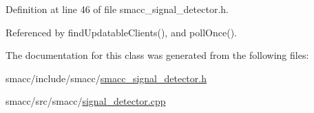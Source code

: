 Definition at line 46 of file smacc\+\_\+signal\+\_\+detector.\+h.



Referenced by find\+Updatable\+Clients(), and poll\+Once().



The documentation for this class was generated from the following files\+:\begin{DoxyCompactItemize}
\item 
smacc/include/smacc/\hyperlink{smacc__signal__detector_8h}{smacc\+\_\+signal\+\_\+detector.\+h}\item 
smacc/src/smacc/\hyperlink{signal__detector_8cpp}{signal\+\_\+detector.\+cpp}\end{DoxyCompactItemize}
